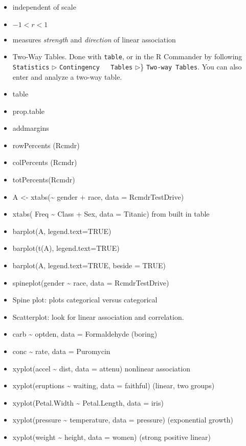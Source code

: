 \documentclass[]{book}
\numberwithin{equation}{chapter}
\numberwithin{figure}{chapter}
\theoremstyle{plain}
\theoremstyle{definition}
\theoremstyle{remark}
\theoremstyle{definition}
\theoremstyle{definition}
\theoremstyle{remark}
\begin{document}
\begin{itemize}
\item
  independent of scale
\item
  \(-1< r <1\)
\item
  measures \emph{strength} and \emph{direction} of linear association
\item
  Two-Way Tables. Done with \texttt{table}, or in the R Commander by
  following \texttt{Statistics} \(\triangleright\)
  \texttt{Contingency\ \ \ Tables} \(\triangleright\)\}
  \texttt{Two-way\ Tables}. You can also enter and analyze a two-way
  table.
\item
  table
\item
  prop.table
\item
  addmargins
\item
  rowPercents (Rcmdr)
\item
  colPercents (Rcmdr)
\item
  totPercents(Rcmdr)
\item
  A \textless{}- xtabs(\textasciitilde{} gender + race, data =
  RcmdrTestDrive)
\item
  xtabs( Freq \textasciitilde{} Class + Sex, data = Titanic) from built
  in table
\item
  barplot(A, legend.text=TRUE)
\item
  barplot(t(A), legend.text=TRUE)
\item
  barplot(A, legend.text=TRUE, beside = TRUE)
\item
  spineplot(gender \textasciitilde{} race, data = RcmdrTestDrive)
\item
  Spine plot: plots categorical versus categorical
\item
  Scatterplot: look for linear association and correlation.
\item
  carb \textasciitilde{} optden, data = Formaldehyde (boring)
\item
  conc \textasciitilde{} rate, data = Puromycin
\item
  xyplot(accel \textasciitilde{} dist, data = attenu) nonlinear
  association
\item
  xyplot(eruptions \textasciitilde{} waiting, data = faithful) (linear,
  two groups)
\item
  xyplot(Petal.Width \textasciitilde{} Petal.Length, data = iris)
\item
  xyplot(pressure \textasciitilde{} temperature, data = pressure)
  (exponential growth)
\item
  xyplot(weight \textasciitilde{} height, data = women) (strong positive
  linear)
\end{itemize}
\end{document}
